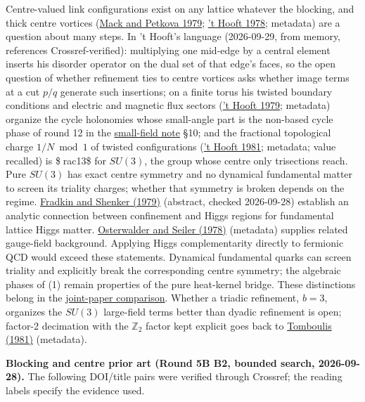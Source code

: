 \documentclass[11pt,a4paper]{article}
\begin{document}
Centre-valued link configurations exist on any lattice whatever the
blocking, and thick centre vortices
(\href{https://doi.org/10.1016/0003-4916(79)90346-4}{Mack and Petkova
1979}; \href{https://doi.org/10.1016/0550-3213(78)90153-0}{'t Hooft
1978}; metadata) are a question about many steps. In 't Hooft's language
(2026-09-29, from memory, references Crossref-verified): multiplying one
mid-edge by a central element inserts his disorder operator on the dual
set of that edge's faces, so the open question of whether refinement
ties to centre vortices asks whether image terms at a cut \(p/q\)
generate such insertions; on a finite torus his twisted boundary
conditions and electric and magnetic flux sectors
(\href{https://doi.org/10.1016/0550-3213(79)90595-9}{'t Hooft 1979};
metadata) organize the cycle holonomies whose small-angle part is the
non-based cycle phase of round 12 in the
\href{su2-midplane-small-field.md}{small-field note} §10; and the
fractional topological charge \(1/N \bmod 1\) of twisted configurations
(\href{https://doi.org/10.1007/BF01208900}{'t Hooft 1981}; metadata;
value recalled) is \$rac13\$ for \(SU(3)\), the group whose centre only
trisections reach. Pure \(SU(3)\) has exact centre symmetry and no
dynamical fundamental matter to screen its triality charges; whether
that symmetry is broken depends on the regime.
\href{https://doi.org/10.1103/PhysRevD.19.3682}{Fradkin and Shenker
(1979)} (abstract, checked 2026-09-28) establish an analytic connection
between confinement and Higgs regions for fundamental lattice Higgs
matter. \href{https://doi.org/10.1016/0003-4916(78)90039-8}{Osterwalder
and Seiler (1978)} (metadata) supplies related gauge-field background.
Applying Higgs complementarity directly to fermionic QCD would exceed
these statements. Dynamical fundamental quarks can screen triality and
explicitly break the corresponding centre symmetry; the algebraic phases
of (1) remain properties of the pure heat-kernel bridge. These
distinctions belong in the \href{three-continuum-limits.md}{joint-paper
comparison}. Whether a triadic refinement, \(b=3\), organizes the
\(SU(3)\) large-field terms better than dyadic refinement is open;
factor-2 decimation with the \(\mathbb Z_2\) factor kept explicit goes
back to \href{https://doi.org/10.1103/PhysRevD.23.2371}{Tomboulis
(1981)} (metadata).

\textbf{Blocking and centre prior art (Round 5B B2, bounded search,
2026-09-28).} The following DOI/title pairs were verified through
Crossref; the reading labels specify the evidence used.
\end{document}
